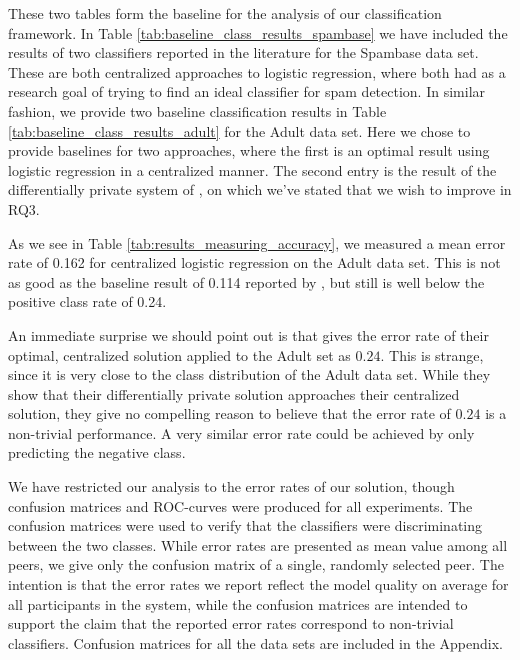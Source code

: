 These two tables form the baseline for the analysis of our classification framework. In Table \ref{tab:baseline_class_results_spambase} we have included the results of two classifiers reported in the literature \citep{sharma2013adaptive,kumar2012comparative} for the Spambase data set. These are both centralized approaches to logistic regression, where both had as a research goal of trying to find an ideal classifier for spam detection. In similar fashion, we provide two baseline classification results in Table \ref{tab:baseline_class_results_adult} for the Adult data set. Here we chose to provide baselines for two approaches, where the first \citep{caruana2006empirical} is an optimal result using logistic regression in a centralized manner. The second entry is the result of the differentially private system of \cite{pathak2010diffprivhomo}, on which we've stated that we wish to improve in RQ3.

As we see in Table \ref{tab:results_measuring_accuracy}, we measured a mean error rate of 0.162 for centralized logistic regression on the Adult data set. This is not as good as the baseline result of 0.114 reported by \citep{caruana2006empirical}, but still is well below the positive class rate of 0.24.

An immediate surprise we should point out is that \cite{pathak2010diffprivhomo} gives the error rate of their optimal, centralized solution applied to the Adult set as $0.24$. This is strange, since it is very close to the class distribution of the Adult data set. While they show that their differentially private solution approaches their centralized solution, they give no compelling reason to believe that the error rate of $0.24$ is a non-trivial performance. A very similar error rate could be achieved by only predicting the negative class.



We have restricted our analysis to the error rates of our solution, though confusion matrices and ROC-curves were produced for all experiments. The confusion matrices were used to verify that the classifiers were discriminating between the two classes. While error rates are presented as mean value among all peers, we give only the confusion matrix of a single, randomly selected peer. The intention is that the error rates we report reflect the model quality on average for all participants in the system, while the confusion matrices are intended to support the claim that the reported error rates correspond to non-trivial classifiers. Confusion matrices for all the data sets are included in the Appendix.



